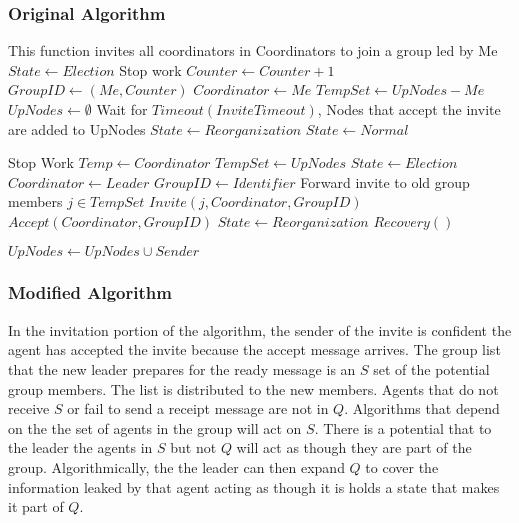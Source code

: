 \subsubsection{Original Algorithm}

\begin{algorithmic}[1]
\small
{}
    \State This function invites all coordinators in Coordinators to join a group led by Me
    \State $State \gets Election$
    \State Stop work
    \State $Counter \gets Counter+1$
    \State $GroupID \gets (Me,Counter)$
    \State $Coordinator \gets Me$
    \State $TempSet \gets UpNodes - {Me}$
    \State $UpNodes \gets \emptyset$
    \EndFor
    \EndFor
    \State Wait for $Timeout(InviteTimeout)$, Nodes that accept the invite are added to UpNodes
    \State $State \gets Reorganization$
    \EndFor
    \State $State \gets Normal$
\EndFunction

\State

        \Return
    \EndIf
    \State Stop Work
    \State $Temp \gets Coordinator$
    \State $TempSet \gets UpNodes$
    \State $State \gets Election$
    \State $Coordinator \gets Leader$
    \State $GroupID \gets Identifier$
        \State Forward invite to old group members
        \For $j \in TempSet$
            \State $Invite(j,Coordinator,GroupID)$
        \EndFor
    \EndIf
    \State $Accept(Coordinator,GroupID)$
    \State $State \gets Reorganization$
        \State $Recovery()$
    \EndIf
\EndFunction

        \State $UpNodes \gets UpNodes \cup {Sender}$
    \EndIf
\EndFunction

\State

\end{algorithmic}

\subsubsection{Modified Algorithm}

In the invitation portion of the algorithm, the sender of the invite is confident the agent has accepted the invite because the accept message arrives. The group list that the new leader prepares for the ready message is an $S$ set of the potential group members. The list is distributed to the new members. Agents that do not receive $S$ or fail to send a receipt message are not in $Q$. Algorithms that depend on the the set of agents in the group will act on $S$. There is a potential that to the leader the agents in $S$ but not $Q$ will act as though they are part of the group. Algorithmically, the the leader can then expand $Q$ to cover the information leaked by that agent acting as though it is holds a state that makes it part of $Q$.

